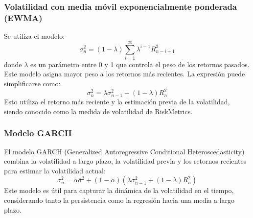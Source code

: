 \subsubsection{Volatilidad con media móvil exponencialmente ponderada (EWMA)}
Se utiliza el modelo:
\[
\sigma_n^2 = (1 - \lambda) \sum_{i=1}^{\infty} \lambda^{i-1} R_{n-i+1}^2
\]
donde $\lambda$ es un parámetro entre 0 y 1 que controla el peso de los retornos pasados. Este modelo asigna mayor peso a los retornos más recientes. La expresión puede simplificarse como:
\[
\boxed{\sigma_n^2 = \lambda \sigma_{n-1}^2 + (1 - \lambda) R_n^2}
\]
Esto utiliza el retorno más reciente y la estimación previa de la volatilidad, siendo conocido como la medida de volatilidad de RiskMetrics.


\subsubsection{Modelo GARCH}
El modelo GARCH (Generalized Autoregressive Conditional Heteroscedasticity) combina la volatilidad a largo plazo, la volatilidad previa y los retornos recientes para estimar la volatilidad actual:
\[
\boxed{\sigma_n^2 = \alpha \overline{\sigma}^2 + (1 - \alpha) \left( \lambda \sigma_{n-1}^2 + (1 - \lambda) R_n^2 \right)}
\]
Este modelo es útil para capturar la dinámica de la volatilidad en el tiempo, considerando tanto la persistencia como la regresión hacia una media a largo plazo.


